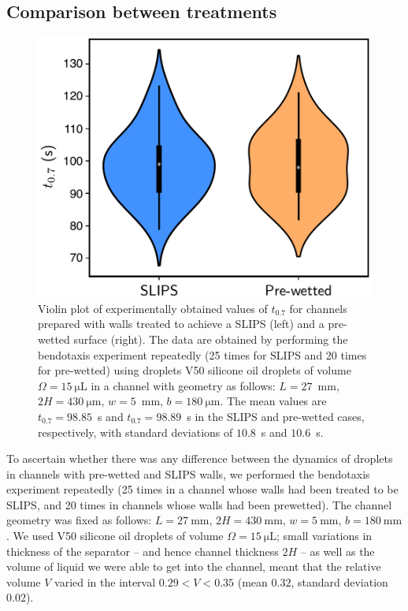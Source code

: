 \begin{subappendices}
\subsection{Comparison between treatments}\label{Appendix:Ch3:SurfaceTreatment:Comparison}
\begin{figure}[t]
\centering
\includegraphics[scale=0.45]{SLIPS_vs_Prewet}
\caption{Violin plot of experimentally obtained values of $t_{0.7}$ for channels prepared with walls treated to achieve a SLIPS (left) and a pre-wetted surface (right). The data are obtained by performing the bendotaxis experiment repeatedly (25 times for SLIPS and 20 times for pre-wetted) using droplets V50 silicone oil droplets of volume $\Omega = 15~\si{\micro}$L in a channel with geometry as follows: $L = 27$~mm, $2H = 430~\si{\micro}$m, $w = 5$~mm, $b = 180~\si{\micro}$m. The mean values are $t_{0.7} = 98.85$~s and $t_{0.7} = 98.89$~s in the SLIPS and pre-wetted cases,
respectively, with standard deviations of $10.8$~s and $10.6$~s.  }\label{fig:Ch3:Appendix:SLIPSvsPrewet}
\end{figure}

To ascertain whether there was any difference between the dynamics of droplets in channels with pre-wetted and SLIPS walls, we performed the bendotaxis experiment repeatedly (25 times in a channel whose walls had been treated to be SLIPS, and 20 times in channels whose walls had been prewetted). The channel geometry was fixed as follows: $L = 27~\si{\milli \meter}$, $2H = 430~\si{\milli \meter}$, $w = 5~\si{\milli \meter}$, $b= 180~\si{\milli \meter}$. We used V50 silicone oil droplets of volume $\Omega = 15~\si{\micro \liter}$; small variations in thickness of the separator -- and hence channel thickness $2H$ -- as well as the volume of liquid we were able to get into the channel, meant that the relative volume $V$ varied in the interval $0.29 < V < 0.35$ (mean $0.32$, standard deviation $0.02$).


\end{subappendices}

